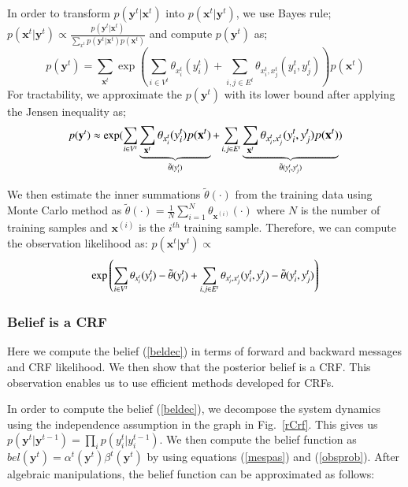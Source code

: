 In order to transform  $p(\mathbf{y}^t|\mathbf{x}^t)$ into  $p(\mathbf{x}^t|\mathbf{y}^t)$, we use Bayes rule;
$p(\mathbf{x}^t|\mathbf{y}^t) \propto  \frac{p(\mathbf{y}^t|\mathbf{x}^t)}{ \sum_{x^t} p(\mathbf{y}^t|\mathbf{x}^t)p(\mathbf{x}^t)}$ and compute $p(\mathbf{y}^t)$ as; %
\begin{equation}
p(\mathbf{y}^t)=\sum_{\mathbf{x}^t} \exp\left( \sum_{i \in V^t} \theta_{x^t_i}(y^t_i) + \sum_{i,j \in E^t} \theta_{x^t_i,x^t_j}(y^t_i,y^t_j) \right) p(\mathbf{x}^t)
\end{equation}
For tractability, we approximate the $p(\mathbf{y}^t)$ with its lower bound after applying the Jensen inequality as;
\begin{equation}
	\small
p(\mathbf{y}^t) \approx \exp ( \sum_{i \in V^t} \underbrace{\sum_{\mathbf{x}^t} \theta_{x^t_i}(y^t_i)  p(\mathbf{x}^t)}_{\tilde{\theta}(y^t_i)} + \sum_{i,j \in E^t} \underbrace{ \sum_{\mathbf{x}^t}  \theta_{x^t_i,x^t_j}(y^t_i,y^t_j) p(\mathbf{x}^t)}_{\tilde{\theta}(y^t_i,y^t_j)} )
\end{equation}

We then estimate the inner summations $\tilde{\theta}(\cdot)$
from the training data
using Monte Carlo method
 as \mbox{$\tilde{\theta}(\cdot) = \frac{1}{N}\sum_{i=1}^N \theta_{\mathbf{x}^{(i)}}(\cdot)$} where $N$ is the number of training samples and $\mathbf{x}^{(i)}$ is the $i^{th}$ training sample.
 Therefore, we can compute the observation likelihood as:  $p(\mathbf{x}^t|\mathbf{y}^t) \propto$
\begin{equation}\small
\exp\left( \sum_{i \in V^t} \theta_{x^t_i}(y^t_i) - \tilde{\theta}(y^t_i) + \sum_{i,j \in E^t} \theta_{x^t_i,x^t_j}(y^t_i,y^t_j) - \tilde{\theta}(y^t_i,y^t_j)  \right)
\label{obsprob}
\end{equation}

\subsubsection{Belief is a CRF}
\label{beliscrf}
Here we compute the belief (\ref{beldec}) in terms of forward and backward messages and CRF likelihood. We then show that the posterior belief is a CRF. This observation enables us to use efficient methods developed for CRFs.

In order to compute the belief (\ref{beldec}), we decompose
the system dynamics using the independence assumption in the graph in Fig.~\ref{rCrf}.
This gives us \mbox{$p(\mathbf{y}^t|\mathbf{y}^{t-1})=\prod_{i} p(y^t_i|y^{t-1}_i)$}.
%
%
We then compute the belief function as \mbox{$bel(\mathbf{y}^t)=\alpha^t(\mathbf{y}^t)\beta^t(\mathbf{y}^t)$} by using equations (\ref{mespas}) and (\ref{obsprob}). After algebraic manipulations, the belief function can be approximated as follows:

